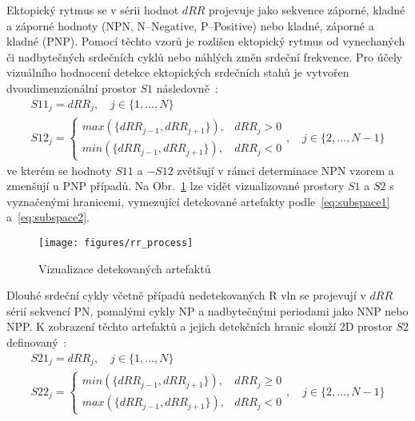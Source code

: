 Ektopický rytmus se v sérii hodnot $dRR$ projevuje jako sekvence záporné, kladné
a záporné hodnoty (NPN, N--Negative, P--Positive) nebo kladné, záporné a
kladné (PNP). Pomocí těchto vzorů je rozlišen ektopický rytmus od vynechaných
či nadbytečných srdečních cyklů nebo náhlých změn srdeční frekvence. 
Pro účely vizuálního hodnocení detekce ektopických
srdečních stahů je vytvořen dvoudimenzionální prostor $S1$
následovně~\cite{Lipponen2019}:
\begin{gather}
    S11_j = dRR_j, \quad j \in \{1,...,N\} \nonumber \\
    S12_j =
    \begin{cases}
        max(\{dRR_{j-1}, dRR_{j+1}\}), & dRR_j > 0 \\
        min(\{dRR_{j-1}, dRR_{j+1}\}), & dRR_j < 0
    \end{cases}
    , \quad j \in \{2,...,N-1\}
    \label{eq:subspace1}
\end{gather}
ve kterém se hodnoty $S11$ a $-S12$ zvětšují v rámci determinace NPN vzorem a
zmenšují u PNP případů. Na Obr.~\ref{fig:rr_process} lze vidět vizualizované
prostory $S1$ a $S2$ s vyznačenými hranicemi, vymezující detekované artefakty
podle~\eqref{eq:subspace1} a~\eqref{eq:subspace2}.

\begin{figure}[h]
    \begin{center}
        \texttt{[image: figures/rr\_process]}
        \caption{Vizualizace detekovaných artefaktů}
        \label{fig:rr_process}
    \end{center}
\end{figure}

Dlouhé srdeční cykly včetně případů nedetekovaných R vln se projevují v $dRR$
sérií sekvencí PN, pomalými cykly NP a nadbytečnými periodami jako NNP nebo NPP. K
zobrazení těchto artefaktů a jejich detekčních hranic slouží 2D prostor $S2$
definovaný~\cite{Lipponen2019}:
\begin{gather}
    S21_j = dRR_j, \quad j \in \{1,...,N\} \nonumber \\
    S22_j =
    \begin{cases}
        min(\{dRR_{j-1}, dRR_{j+1}\}), & dRR_j \geq 0 \\
        max(\{dRR_{j-1}, dRR_{j+1}\}), & dRR_j < 0
    \end{cases}
    , \quad j \in \{2,...,N-1\}
    \label{eq:subspace2}
\end{gather}

